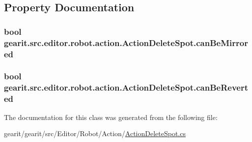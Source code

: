 \subsection{Property Documentation}
\hypertarget{classgearit_1_1src_1_1editor_1_1robot_1_1action_1_1_action_delete_spot_a59ad38e82309821a051d4d63334364b2}{
\subsubsection[{can\+Be\+Mirrored}]{\setlength{\rightskip}{0pt plus 5cm}bool gearit.\+src.\+editor.\+robot.\+action.\+Action\+Delete\+Spot.\+can\+Be\+Mirrored\hspace{0.3cm}{\ttfamily [get]}}}\label{classgearit_1_1src_1_1editor_1_1robot_1_1action_1_1_action_delete_spot_a59ad38e82309821a051d4d63334364b2}
\hypertarget{classgearit_1_1src_1_1editor_1_1robot_1_1action_1_1_action_delete_spot_a8800ec512028bce443bba953699f52d5}{
\subsubsection[{can\+Be\+Reverted}]{\setlength{\rightskip}{0pt plus 5cm}bool gearit.\+src.\+editor.\+robot.\+action.\+Action\+Delete\+Spot.\+can\+Be\+Reverted\hspace{0.3cm}{\ttfamily [get]}}}\label{classgearit_1_1src_1_1editor_1_1robot_1_1action_1_1_action_delete_spot_a8800ec512028bce443bba953699f52d5}


The documentation for this class was generated from the following file\+:\begin{DoxyCompactItemize}
\item 
gearit/gearit/src/\+Editor/\+Robot/\+Action/\hyperlink{_action_delete_spot_8cs}{Action\+Delete\+Spot.\+cs}\end{DoxyCompactItemize}
